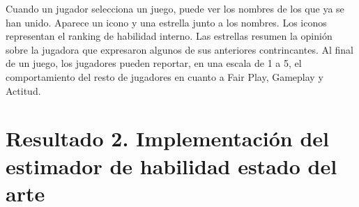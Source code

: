 \documentclass[a4paper,11pt]{book}
\theoremstyle{definition}
\begin{document}
Cuando un jugador selecciona un juego, puede ver los nombres de los que ya se han unido.
%
Aparece un icono y una estrella junto a los nombres.
%
Los iconos representan el ranking de habilidad interno.
%
Las estrellas resumen la opinión sobre la jugadora que expresaron algunos de sus anteriores contrincantes.
%
Al final de un juego, los jugadores pueden reportar, en una escala de 1 a 5, el comportamiento del resto de jugadores en cuanto a Fair Play, Gameplay y Actitud.
%
















































































\chapter{Resultado 2. Implementación del estimador de habilidad estado del arte} \label{ch:ttt}
\end{document}
